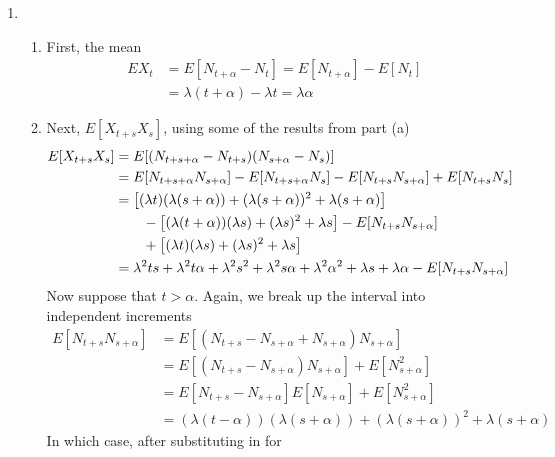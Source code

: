 \documentclass[12pt]{article}
\theoremstyle{plain}
\theoremstyle{definition}
\theoremstyle{remark}
\begin{document}
\begin{enumerate}
\begin{enumerate}
      \item %
        \begin{enumerate}
        \item First, the mean
        \begin{align*}
          EX_t &= E[N_{t+\alpha} - N_t]
            = E[N_{t+\alpha}] - E[N_t]\\
            &= \lambda(t+\alpha) - \lambda t = \lambda \alpha
        \end{align*}

        \item
        Next, $E[X_{t+s} X_s]$, using some of the results from part (a)
        \begin{align}
          E[X_{t+s} X_s]
          &= E[(N_{t+s+\alpha}-N_{t+s})(N_{s+\alpha}-N_s)]\notag\\
          &= E[N_{t+s+\alpha} N_{s+\alpha}]
            - E[N_{t+s+\alpha}N_s]
            - E[N_{t+s}N_{s+\alpha}]
            + E[N_{t+s}N_s]\notag\\
          &= \left[(\lambda t)(\lambda(s+\alpha)) + (\lambda(s+\alpha))^2
            + \lambda (s+\alpha)\right]\notag\\
            & \qquad - \left[(\lambda(t+\alpha))(\lambda s)
               + (\lambda s)^2 + \lambda s\right]
            - E[N_{t+s}N_{s+\alpha}] \notag \\
          &\qquad + \left[(\lambda t)(\lambda s) +
              (\lambda s)^2 + \lambda s\right]\notag\\
          &= \lambda^2 ts + \lambda^2 t\alpha + \lambda^2 s^2
            + \lambda^2 s\alpha + \lambda^2 \alpha^2 + \lambda s
            +\lambda \alpha- E[N_{t+s}N_{s+\alpha}]
            \label{q2c.1}
        \end{align}
        Now suppose that $t>\alpha$. Again, we break up the interval
        into independent increments
        \begin{align*}
          E[N_{t+s}N_{s+\alpha}]
            &= E[(N_{t+s} - N_{s+\alpha} + N_{s+\alpha})N_{s+\alpha}]\\
            &= E[(N_{t+s} - N_{s+\alpha})N_{s+\alpha}]
              + E[N^2_{s+\alpha}]\\
            &= E[N_{t+s} - N_{s+\alpha}]E[N_{s+\alpha}]
              + E[N^2_{s+\alpha}]\\
            &= (\lambda(t-\alpha)) (\lambda (s+\alpha))
              + (\lambda(s+\alpha))^2 + \lambda (s+\alpha)
        \end{align*}
        In which case, after substituting in for

\end{enumerate}
\end{enumerate}
\end{enumerate}
\end{document}
